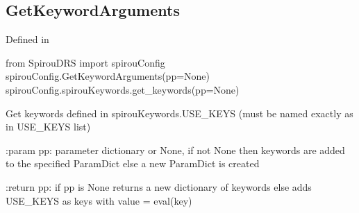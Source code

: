 \noindent\begin{minipage}{\textwidth}
\subsection{GetKeywordArguments}

Defined in \spirouConfig{}

\begin{pythonbox}
from SpirouDRS import spirouConfig
spirouConfig.GetKeywordArguments(pp=None)
spirouConfig.spirouKeywords.get_keywords(pp=None)
\end{pythonbox}

\begin{pythondocstring}
Get keywords defined in spirouKeywords.USE_KEYS 
(must be named exactly as in USE_KEYS list)

:param pp: parameter dictionary or None, if not None then keywords are added
           to the specified ParamDict else a new ParamDict is created

:return pp: if pp is None returns a new dictionary of keywords
            else adds USE_KEYS as keys with value = eval(key)
\end{pythondocstring}
\end{minipage}

